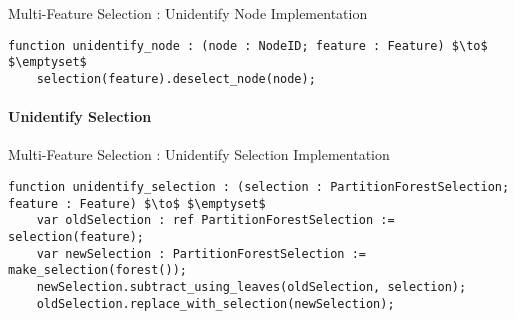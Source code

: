 \begin{stulisting}[H]
\caption{Multi-Feature Selection : Unidentify Node Implementation}
\begin{lstlisting}[style=Default]
function unidentify_node : (node : NodeID; feature : Feature) $\to$ $\emptyset$
	selection(feature).deselect_node(node);
\end{lstlisting}
\end{stulisting}

\paragraph{Unidentify Selection}

\begin{stulisting}[H]
\caption{Multi-Feature Selection : Unidentify Selection Implementation}
\begin{lstlisting}[style=Default]
function unidentify_selection : (selection : PartitionForestSelection; feature : Feature) $\to$ $\emptyset$
	var oldSelection : ref PartitionForestSelection := selection(feature);
	var newSelection : PartitionForestSelection := make_selection(forest());
	newSelection.subtract_using_leaves(oldSelection, selection);
	oldSelection.replace_with_selection(newSelection);
\end{lstlisting}
\end{stulisting}
